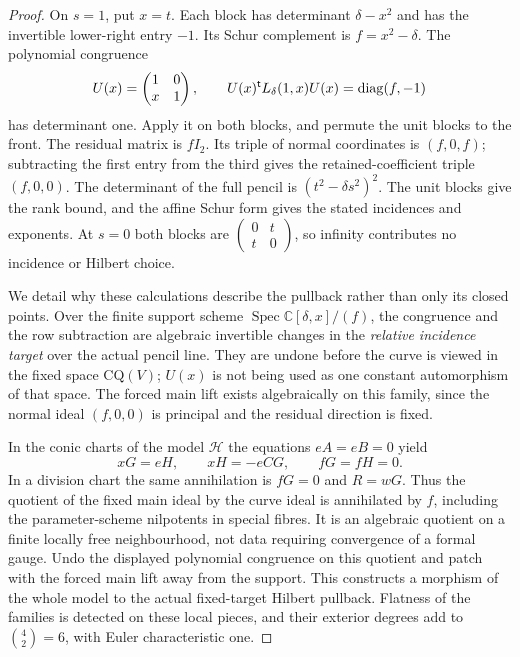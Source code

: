 \documentclass[11pt,reqno]{amsart}
\numberwithin{equation}{section}
\theoremstyle{definition}\newtheorem{definition}[theorem]{Definition}
\theoremstyle{remark}\newtheorem{remark}[theorem]{Remark}
\newcommand{\C}{\mathbb C}\newcommand{\Q}{\mathbb Q}
\DeclareMathOperator{\Spec}{Spec}\DeclareMathOperator{\PGL}{PGL}
\begin{document}
\begin{proof}
On $s=1$, put $x=t$. Each block has determinant $\delta-x^2$ and
has the invertible lower-right entry $-1$. Its Schur complement is
$f=x^2-\delta$. The polynomial congruence
\[
 U(x)=\begin{pmatrix}1&0\\x&1\end{pmatrix},\qquad
 U(x)^{\mathsf t}L_\delta(1,x)U(x)=\operatorname{diag}(f,-1)
\]
has determinant one. Apply it on both blocks, and permute the unit
blocks to the front. The residual matrix is $fI_2$. Its triple of
normal coordinates is $(f,0,f)$; subtracting the first entry from
the third gives the retained-coefficient triple $(f,0,0)$.
The determinant of the full pencil is $(t^2-\delta s^2)^2$.
The unit blocks give the rank bound, and the affine Schur form
gives the stated incidences and exponents. At $s=0$ both blocks are
$\left(\begin{smallmatrix}0&t\\t&0\end{smallmatrix}\right)$,
so infinity contributes no incidence or Hilbert choice.

We detail why these calculations describe the pullback rather than
only its closed points. Over the finite support scheme
$\Spec\C[\delta,x]/(f)$, the congruence and the row subtraction are
algebraic invertible changes in the \emph{relative incidence target}
over the actual pencil line. They are undone before the curve is
viewed in the fixed space $\mathrm{CQ}(V)$; $U(x)$ is not being
used as one constant automorphism of that space. The forced main
lift exists algebraically on this family, since the normal ideal
$(f,0,0)$ is principal and the residual direction is fixed.

In the conic charts of the model $\mathcal H$ the equations
$eA=eB=0$ yield
\[
           xG=eH,\qquad xH=-eCG,\qquad fG=fH=0.
\]
In a division chart the same annihilation is $fG=0$ and $R=wG$.
Thus the quotient of the fixed main ideal by the curve ideal is
annihilated by $f$, including the parameter-scheme nilpotents in
special fibres. It is an algebraic quotient on a finite locally
free neighbourhood, not data requiring convergence of a formal
gauge. Undo the displayed polynomial congruence on this quotient
and patch with the forced main lift away from the support. This
constructs a morphism of the whole model to the actual fixed-target
Hilbert pullback. Flatness of the families is detected on these
local pieces, and their exterior degrees add to
$\binom42=6$, with Euler characteristic one.


\end{proof}
\end{document}
